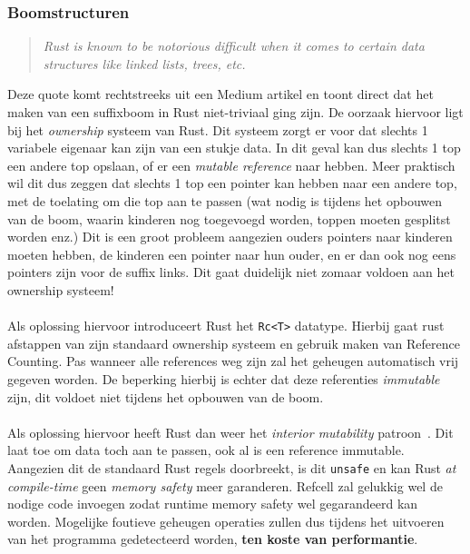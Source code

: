 \subsubsection{Boomstructuren}
\begin{quote}
    \textit{Rust is known to be notorious difficult when it comes to certain data structures like linked lists, trees, etc. \cite{rust_difficulty_quote}}
\end{quote}
Deze quote komt rechtstreeks uit een Medium artikel en toont direct dat het maken van een suffixboom in Rust niet-triviaal ging zijn.
De oorzaak hiervoor ligt bij het \textit{ownership} systeem van Rust.
Dit systeem zorgt er voor dat slechts 1 variabele eigenaar kan zijn van een stukje data.
In dit geval kan dus slechts 1 top een andere top opslaan, of er een \textit{mutable reference} naar hebben.
Meer praktisch wil dit dus zeggen dat slechts 1 top een pointer kan hebben naar een andere top, met de toelating om die top aan te passen (wat nodig is tijdens het opbouwen van de boom, waarin kinderen nog toegevoegd worden, toppen moeten gesplitst worden enz.)
Dit is een groot probleem aangezien ouders pointers naar kinderen moeten hebben, de kinderen een pointer naar hun ouder, en er dan ook nog eens pointers zijn voor de suffix links.
Dit gaat duidelijk niet zomaar voldoen aan het ownership systeem!
\\ \\
Als oplossing hiervoor introduceert Rust het \texttt{Rc<T>} datatype.
Hierbij gaat rust afstappen van zijn standaard ownership systeem en gebruik maken van Reference Counting.
Pas wanneer alle references weg zijn zal het geheugen automatisch vrij gegeven worden.
De beperking hierbij is echter dat deze referenties \textit{immutable} zijn, dit voldoet niet tijdens het opbouwen van de boom.
\\ \\
Als oplossing hiervoor heeft Rust dan weer het \textit{interior mutability} patroon~\cite{interior_mutability}.
Dit laat toe om data toch aan te passen, ook al is een reference immutable.
Aangezien dit de standaard Rust regels doorbreekt, is dit \texttt{unsafe} en kan Rust \textit{at compile-time} geen \textit{memory safety} meer garanderen.
Refcell zal gelukkig wel de nodige code invoegen zodat runtime memory safety wel gegarandeerd kan worden.
Mogelijke foutieve geheugen operaties zullen dus tijdens het uitvoeren van het programma gedetecteerd worden, \textbf{ten koste van performantie}.
\\ \\
